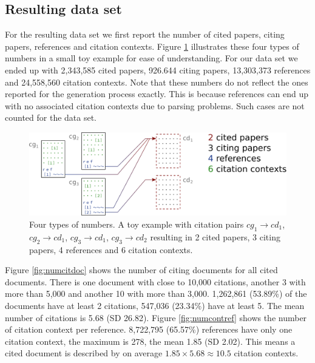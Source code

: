 \subsection{Resulting data set}
For the resulting data set we first report the number of cited papers, citing papers, references and citation contexts. Figure \ref{fig:fournumbers} illustrates these four types of numbers in a small toy example for ease of understanding. For our data set we ended up with 2,343,585 cited papers, 926.644 citing papers, 13,303,373 references and 24,558,560 citation contexts. Note that these numbers do not reflect the ones reported for the generation process exactly. This is because references can end up with no associated citation contexts due to parsing problems. Such cases are not counted for the data set.

\begin{figure}
  \centering
    \includegraphics[width=\textwidth]{figures/dataset/four_types_of_numbers_vertsqueeze.pdf}
  \caption[Four types of numbers.]{Four types of numbers. A toy example with citation pairs $cg_1\rightarrow cd_1$, $cg_2\rightarrow cd_1$, $cg_3\rightarrow cd_1$, $cg_3\rightarrow cd_2$ resulting in 2 cited papers, 3 citing papers, 4 references and 6 citation contexts.}
  \label{fig:fournumbers}
\end{figure}

Figure \ref{fig:numcitdoc} shows the number of citing documents for all cited documents. There is one document with close to 10,000 citations, another 3 with more than 5,000 and another 10 with more than 3,000. 1,262,861 (53.89\%) of the documents have at least 2 citations, 547,036 (23.34\%) have at least 5. The mean number of citations is 5.68 (SD 26.82). Figure \ref{fig:numcontref} shows the number of citation context per reference. 8,722,795 (65.57\%) references have only one citation context, the maximum is 278, the mean 1.85 (SD 2.02). This means a cited document is described by on average $1.85 \times 5.68 \approx 10.5$ citation contexts.


